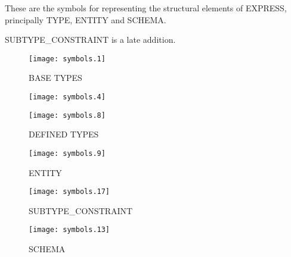 \begin{remarks}
\remintro
{}

These are the symbols for representing the structural elements of EXPRESS,
principally TYPE, ENTITY and SCHEMA. 

SUBTYPE\_CONSTRAINT is a late addition.

\remend
\end{remarks}

\ifnotes
  \vspace*{-2\beftit}
\fi
{}


\begin{figure}[hp]
\centering
\texttt{[image: symbols.1]}

\ifnotes
  \vspace{\baselineskip}
\else
  \vspace{\afttit}
\fi

BASE TYPES

\ifnotes
  \vspace{\baselineskip}
\else
  \vspace{\afttit}
\fi

\texttt{[image: symbols.4]}

\ifnotes
  \vspace{\baselineskip}
\else
  \vspace{\afttit}
\fi

\texttt{[image: symbols.8]}

\ifnotes
  \vspace{\baselineskip}
\else
  \vspace{\afttit}
\fi

DEFINED TYPES

\ifnotes
  \vspace{\baselineskip}
\else
  \vspace{\afttit}
\fi

\texttt{[image: symbols.9]}

\ifnotes
  \vspace{\baselineskip}
\else
  \vspace{\afttit}
\fi

ENTITY

\ifnotes
  \vspace{\baselineskip}
\else
  \vspace{\afttit}
\fi

\texttt{[image: symbols.17]}

\ifnotes
  \vspace{\baselineskip}
\else
  \vspace{\afttit}
\fi

SUBTYPE\_CONSTRAINT

\ifnotes
  \vspace{\baselineskip}
\else
  \vspace{\afttit}
\fi

\texttt{[image: symbols.13]}

\ifnotes
  \vspace{\baselineskip}
\else
  \vspace{\afttit}
\fi

SCHEMA
\end{figure}


